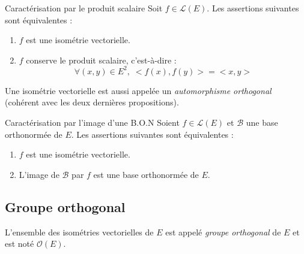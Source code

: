\documentclass[french,11pt,twoside]{VcCours}
\begin{document}
\begin{Demonstration}{}

\vspace{2.5cm}
\end{Demonstration}

\begin{Proposition}{Caractérisation par le produit scalaire}
Soit $f \in \mathcal{L}(E)$. Les assertions suivantes sont équivalentes :
\begin{enumerate}
\item $f$ est une isométrie vectorielle.
\item $f$ conserve le produit scalaire, c'est-à-dire :
$$ \forall (x,y) \in E^2, \; <f(x),f(y)>=<x,y> $$
\end{enumerate}
\end{Proposition}

\begin{Remarque}{} Une isométrie vectorielle est aussi appelée un \emph{automorphisme orthogonal} (cohérent avec les deux dernières propositions).
\end{Remarque}

\begin{Demonstration}{}
\vspace{7cm}
\end{Demonstration}

\begin{Proposition}{Caractérisation par l'image d'une B.O.N}
Soient $f \in \mathcal{L}(E)$ et $\mathcal{B}$ une base orthonormée de $E$. Les assertions suivantes sont équivalentes :
\begin{enumerate}
\item $f$ est une isométrie vectorielle.
\item L'image de $\mathcal{B}$ par $f$ est une base orthonormée de $E$.
\end{enumerate}
\end{Proposition}

\begin{Demonstration}{}
\vspace{7cm}
\end{Demonstration}

\subsection{Groupe orthogonal}

\begin{Definition}{} L'ensemble des isométries vectorielles de $E$ est appelé \emph{groupe orthogonal} de $E$ et est noté $\mathcal{O}(E)$. 
\end{Definition}
\end{document}
